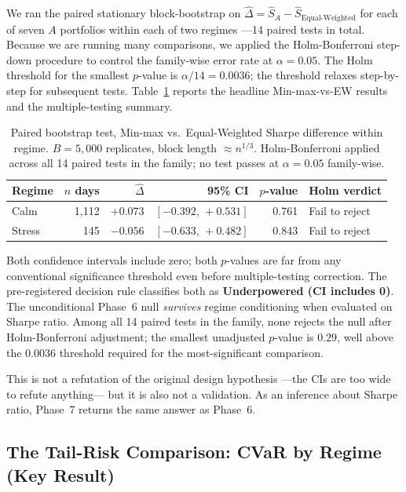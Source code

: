 \documentclass[11pt,letterpaper]{article}
\begin{document}
We ran the paired stationary block-bootstrap on $\widehat\Delta = \widehat S_A - \widehat S_{\text{Equal-Weighted}}$ for each of seven $A$ portfolios within each of two regimes —14 paired tests in total. Because we are running many comparisons, we applied the Holm-Bonferroni step-down procedure \citep{holm1979simple} to control the family-wise error rate at $\alpha = 0.05$. The Holm threshold for the smallest $p$-value is $\alpha/14 = 0.0036$; the threshold relaxes step-by-step for subsequent tests. Table~\ref{tab:paired-test} reports the headline Min-max-vs-EW results and the multiple-testing summary.

\begin{table}[h]
\centering
\caption{Paired bootstrap test, Min-max vs.\ Equal-Weighted Sharpe difference within regime. $B = 5{,}000$ replicates, block length $\approx n^{1/3}$. Holm-Bonferroni applied across all 14 paired tests in the family; no test passes at $\alpha = 0.05$ family-wise.}
\label{tab:paired-test}
\begin{tabular}{lrrrrl}
\toprule
Regime & $n$ days & $\widehat\Delta$ & 95\% CI & $p$-value & Holm verdict \\
\midrule
Calm   & 1{,}112 & $+0.073$ & $[-0.392,\, +0.531]$ & 0.761 & Fail to reject \\
Stress &    145  & $-0.056$ & $[-0.633,\, +0.482]$ & 0.843 & Fail to reject \\
\bottomrule
\end{tabular}
\end{table}

Both confidence intervals include zero; both $p$-values are far from any conventional significance threshold even before multiple-testing correction. The pre-registered decision rule classifies both as \textbf{Underpowered (CI includes 0)}. The unconditional Phase~6 null \emph{survives} regime conditioning when evaluated on Sharpe ratio. Among all 14 paired tests in the family, none rejects the null after Holm-Bonferroni adjustment; the smallest unadjusted $p$-value is $0.29$, well above the $0.0036$ threshold required for the most-significant comparison.

This is not a refutation of the original design hypothesis —the CIs are too wide to refute anything— but it is also not a validation. As an inference about Sharpe ratio, Phase~7 returns the same answer as Phase~6.

\subsection{The Tail-Risk Comparison: CVaR by Regime (Key Result)}
\end{document}
